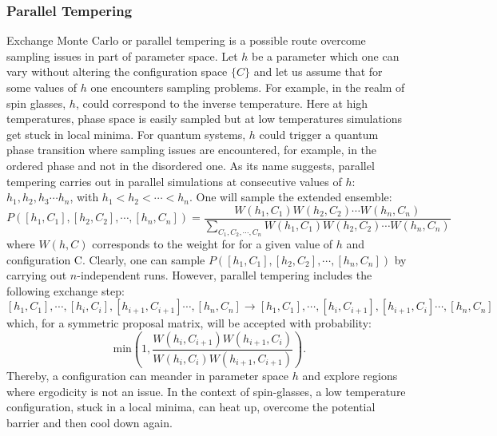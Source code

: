 \subsubsection{Parallel Tempering } 
% 
Exchange Monte Carlo \cite{Hukushima96}  or parallel tempering \cite{Greyer91}   is a possible route  overcome  sampling issues in part of  parameter space.  Let $h$ be a parameter which one can vary without  altering the configuration space $ \{C  \}  $ and let us assume that for some values of $h$ one encounters sampling problems.   For example, in the realm of spin glasses, $h$, could correspond to the  inverse temperature.  Here at high temperatures,  phase space is easily sampled   but at low temperatures  simulations get stuck in local minima. For quantum systems, $h$ could   trigger a quantum phase transition where  sampling issues are encountered, for example, in the ordered phase and not in the disordered one.   As its name suggests, parallel tempering  carries out in parallel simulations at consecutive  values of  $h$:  $h_1, h_2, h_3   \cdots h_n$, with  $h_{1} < h_2 < \cdots < h_n$.  One will sample the extended ensemble: \begin{equation}
	P(\left[h_1,C_1\right], \left[h_2,C_2\right], \cdots, \left[h_n,C_n\right] ) =  \frac{W(h_1,C_1) W(h_2,C_2) \cdots   W(h_n,C_n) } {\sum_{C_1, C_2, \cdots, C_n} W( h_1,C_1) W( h_2,C_2) \cdots   W(h_n,C_n)}
\end{equation}
where $W(h,C)$ corresponds   to the weight  for  for a given value of $h$ and configuration C.     Clearly, one can sample  $P( \left[h_1,C_1\right], \left[h_2,C_2\right], \cdots, \left[h_n,C_n\right])$ by carrying out $n$-independent runs.  However, parallel tempering  includes the following   exchange step:
\begin{equation}
	\left[h_1,C_1\right], \cdots, \left[h_i,C_i\right],\left[h_{i+1},C_{i+1}\right] \cdots, \left[h_n,C_n\right]   \rightarrow 
	\left[h_1,C_1\right], \cdots, \left[h_i,C_{i+1}\right],\left[h_{i+1},C_{i}\right] \cdots, \left[h_n,C_n\right] 
\end{equation}
which, for a symmetric proposal matrix, will  be accepted with probability: 
\begin{equation}
	\text{ min} \left( 1,   \frac{ W(h_i,C_{i+1}) W(h_{i+1},C_{i})}{W(h_i,C_{i}) W(h_{i+1},C_{i+1})} \right).
\end{equation}
 Thereby,  a configuration can meander in parameter space $h$ and  explore regions where ergodicity  is not an issue.     In the context of spin-glasses,  a low temperature  configuration, stuck in a local minima, can heat up, overcome the potential  barrier and then cool down again. 
 
